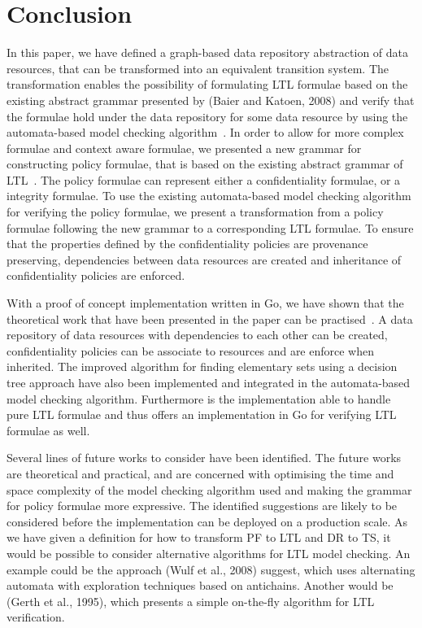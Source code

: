 \section{Conclusion}
In this paper, we have defined a graph-based data repository abstraction of data resources, that can be transformed into an equivalent transition system. The transformation enables the possibility of formulating LTL formulae based on the existing abstract grammar presented by (Baier and Katoen, 2008)\cite{baier2008principles} and verify that the formulae hold under the data repository for some data resource by using the automata-based model checking algorithm~\cite{baier2008principles}. In order to allow for more complex formulae and context aware formulae, we presented a new grammar for constructing policy formulae, that is based on the existing abstract grammar of LTL~\cite{baier2008principles}. The policy formulae can represent either a confidentiality formulae, or a integrity formulae. To use the existing automata-based model checking algorithm for verifying the policy formulae, we present a transformation from a policy formulae following the new grammar to a corresponding LTL formulae. To ensure that the properties defined by the confidentiality policies are provenance preserving, dependencies between data resources are created and inheritance of confidentiality policies are enforced.

With a proof of concept implementation written in Go, we have shown that the theoretical work that have been presented in the paper can be practised~\cite{}. A data repository of data resources with dependencies to each other can be created, confidentiality policies can be associate to resources and are enforce when inherited. The improved algorithm for finding elementary sets using a decision tree approach have also been implemented and integrated in the automata-based model checking algorithm. Furthermore is the implementation able to handle pure LTL formulae and thus offers an implementation in Go for verifying LTL formulae as well.

Several lines of future works to consider have been identified. The future works are theoretical and practical, and are concerned with optimising the time and space complexity of the model checking algorithm used and making the grammar for policy formulae more expressive. The identified suggestions are likely to be considered before the implementation can be deployed on a production scale. As we have given a definition for how to transform PF to LTL and DR to TS, it would be possible to consider alternative algorithms for LTL model checking. An example could be the approach (Wulf et al., 2008)\cite{de2008antichains} suggest, which uses alternating automata with exploration techniques based on antichains. Another would be (Gerth et al., 1995)\cite{gerth1995simple}, which presents a simple on-the-fly algorithm for LTL verification.
